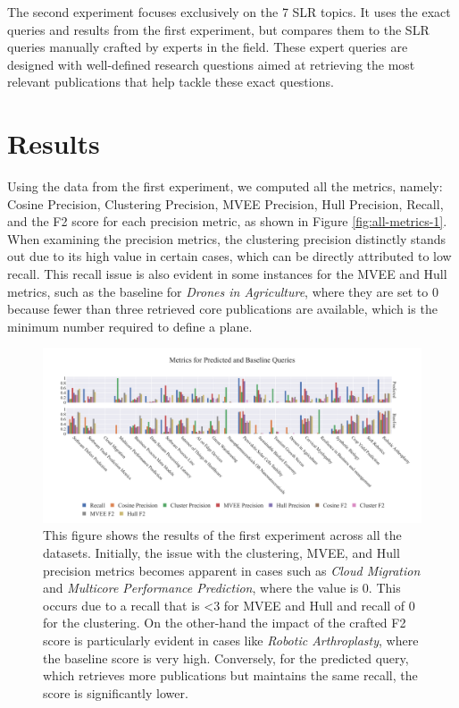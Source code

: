 The second experiment focuses exclusively on the 7 SLR topics. It uses the exact queries and results from the first experiment, but compares them to the SLR queries manually crafted by experts in the field. These expert queries are designed with well-defined research questions aimed at retrieving the most relevant publications that help tackle these exact questions.

\section{Results}
Using the data from the first experiment, we computed all the metrics, namely: Cosine Precision, Clustering Precision, MVEE Precision, Hull Precision, Recall, and the F2 score for each precision metric, as shown in Figure \autoref{fig:all-metrics-1}. When examining the precision metrics, the clustering precision distinctly stands out due to its high value in certain cases, which can be directly attributed to low recall. This recall issue is also evident in some instances for the MVEE and Hull metrics, such as the baseline for \textit{Drones in Agriculture}, where they are set to 0 because fewer than three retrieved core publications are available, which is the minimum number required to define a plane.

\begin{figure}[!b]
	\hspace*{-1cm}	
	\includegraphics[scale=0.45]{pics/all-metrics-1.pdf}
	\caption[Evaluation: Experiment 1]{This figure shows the results of the first experiment across all the datasets. Initially, the issue with the clustering, MVEE, and Hull precision metrics becomes apparent in cases such as \textit{Cloud Migration} and \textit{Multicore Performance Prediction}, where the value is 0. This occurs due to a recall that is <3 for MVEE and Hull and recall of 0 for the clustering. On the other-hand the impact of the crafted F2 score is particularly evident in cases like \textit{Robotic Arthroplasty}, where the baseline score is very high. Conversely, for the predicted query, which retrieves more publications but maintains the same recall, the score is significantly lower.}\label{fig:all-metrics-1}
\end{figure}

